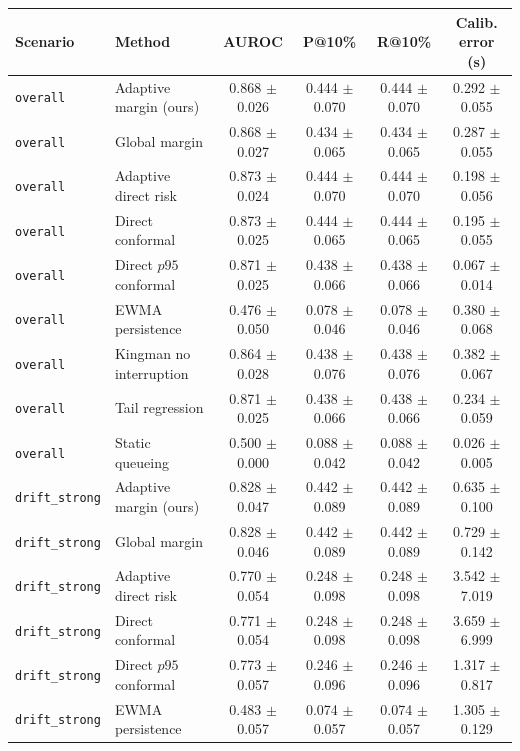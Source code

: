 \begin{tabular}{llcccc}
\hline
Scenario & Method & AUROC & P@10\% & R@10\% & Calib. error (s) \\
\hline
\texttt{overall} & Adaptive margin (ours) & 0.868 $\pm$ 0.026 & 0.444 $\pm$ 0.070 & 0.444 $\pm$ 0.070 & 0.292 $\pm$ 0.055 \\
\texttt{overall} & Global margin & 0.868 $\pm$ 0.027 & 0.434 $\pm$ 0.065 & 0.434 $\pm$ 0.065 & 0.287 $\pm$ 0.055 \\
\texttt{overall} & Adaptive direct risk & 0.873 $\pm$ 0.024 & 0.444 $\pm$ 0.070 & 0.444 $\pm$ 0.070 & 0.198 $\pm$ 0.056 \\
\texttt{overall} & Direct conformal & 0.873 $\pm$ 0.025 & 0.444 $\pm$ 0.065 & 0.444 $\pm$ 0.065 & 0.195 $\pm$ 0.055 \\
\texttt{overall} & Direct $p95$ conformal & 0.871 $\pm$ 0.025 & 0.438 $\pm$ 0.066 & 0.438 $\pm$ 0.066 & 0.067 $\pm$ 0.014 \\
\texttt{overall} & EWMA persistence & 0.476 $\pm$ 0.050 & 0.078 $\pm$ 0.046 & 0.078 $\pm$ 0.046 & 0.380 $\pm$ 0.068 \\
\texttt{overall} & Kingman no interruption & 0.864 $\pm$ 0.028 & 0.438 $\pm$ 0.076 & 0.438 $\pm$ 0.076 & 0.382 $\pm$ 0.067 \\
\texttt{overall} & Tail regression & 0.871 $\pm$ 0.025 & 0.438 $\pm$ 0.066 & 0.438 $\pm$ 0.066 & 0.234 $\pm$ 0.059 \\
\texttt{overall} & Static queueing & 0.500 $\pm$ 0.000 & 0.088 $\pm$ 0.042 & 0.088 $\pm$ 0.042 & 0.026 $\pm$ 0.005 \\
\hline
\texttt{drift\_strong} & Adaptive margin (ours) & 0.828 $\pm$ 0.047 & 0.442 $\pm$ 0.089 & 0.442 $\pm$ 0.089 & 0.635 $\pm$ 0.100 \\
\texttt{drift\_strong} & Global margin & 0.828 $\pm$ 0.046 & 0.442 $\pm$ 0.089 & 0.442 $\pm$ 0.089 & 0.729 $\pm$ 0.142 \\
\texttt{drift\_strong} & Adaptive direct risk & 0.770 $\pm$ 0.054 & 0.248 $\pm$ 0.098 & 0.248 $\pm$ 0.098 & 3.542 $\pm$ 7.019 \\
\texttt{drift\_strong} & Direct conformal & 0.771 $\pm$ 0.054 & 0.248 $\pm$ 0.098 & 0.248 $\pm$ 0.098 & 3.659 $\pm$ 6.999 \\
\texttt{drift\_strong} & Direct $p95$ conformal & 0.773 $\pm$ 0.057 & 0.246 $\pm$ 0.096 & 0.246 $\pm$ 0.096 & 1.317 $\pm$ 0.817 \\
\texttt{drift\_strong} & EWMA persistence & 0.483 $\pm$ 0.057 & 0.074 $\pm$ 0.057 & 0.074 $\pm$ 0.057 & 1.305 $\pm$ 0.129 \\

\end{tabular}
